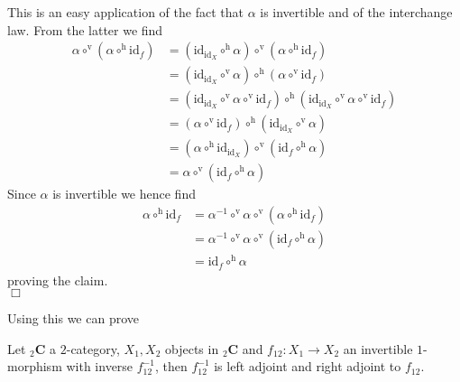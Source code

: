 \begin{prf}
This is an easy application of the fact that $\alpha$ is invertible and of the interchange law. From the latter we find
\begin{align*}
  \alpha
  \circ^{\mathrm{v}}
  \left(
    \alpha
    \circ^{\mathrm{h}}
    \mathrm{id}_{f}
  \right)
  &=
  \left(
    \mathrm{id}_{\mathrm{id}_{X}}
    \circ^{\mathrm{h}}
    \alpha
  \right)
  \circ^{\mathrm{v}}
  \left(
    \alpha
    \circ^{\mathrm{h}}
    \mathrm{id}_{f}
  \right)
  \\
  &=
  \left(
    \mathrm{id}_{\mathrm{id}_{X}}
    \circ^{\mathrm{v}}
    \alpha
  \right)
  \circ^{\mathrm{h}}
  \left(
    \alpha
    \circ^{\mathrm{v}}
    \mathrm{id}_{f}
  \right)
  \\
  &=
  \left(
    \mathrm{id}_{\mathrm{id}_{X}}
    \circ^{\mathrm{v}}
    \alpha
    \circ^{\mathrm{v}}
    \mathrm{id}_{f}
  \right)
  \circ^{\mathrm{h}}
  \left(
    \mathrm{id}_{\mathrm{id}_{X}}
    \circ^{\mathrm{v}}
    \alpha
    \circ^{\mathrm{v}}
    \mathrm{id}_{f}
  \right)
  \\
  &=
  \left(
    \alpha
    \circ^{\mathrm{v}}
    \mathrm{id}_{f}
  \right)
  \circ^{\mathrm{h}}
  \left(
    \mathrm{id}_{\mathrm{id}_{X}}
    \circ^{\mathrm{v}}
    \alpha
  \right)
  \\
  &=
  \left(
    \alpha
    \circ^{\mathrm{h}}
    \mathrm{id}_{\mathrm{id}_{X}}
  \right)
  \circ^{\mathrm{v}}
  \left(
    \mathrm{id}_{f}
    \circ^{\mathrm{h}}
    \alpha
  \right)
  \\
  &=
  \alpha
  \circ^{\mathrm{v}}
  \left(
    \mathrm{id}_{f}
    \circ^{\mathrm{h}}
    \alpha
  \right)
\end{align*}
Since $\alpha$ is invertible we hence find
\begin{align*}
  \alpha
  \circ^{\mathrm{h}}
  \mathrm{id}_{f}
  &=
  \alpha^{-1}
  \circ^{\mathrm{v}}
  \alpha
  \circ^{\mathrm{v}}
  \left(
    \alpha
    \circ^{\mathrm{h}}
    \mathrm{id}_{f}
  \right)
  \\
  &=
  \alpha^{-1}
  \circ^{\mathrm{v}}
  \alpha
  \circ^{\mathrm{v}}
  \left(
    \mathrm{id}_{f}
    \circ^{\mathrm{h}}
    \alpha
  \right)
  \\
  &=
  \mathrm{id}_{f}
  \circ^{\mathrm{h}}
  \alpha
\end{align*}
proving the claim.
\\
\phantom{proven}
\hfill
$\Box$
\end{prf}
Using this we can prove
\\
\begin{lem}
\label{lem:adjequiv}
Let ${_{2}}\mathbf{C}$ a $2$-category, $X_{1},X_{2}$ objects in ${_{2}}\mathbf{C}$ and $f_{12} \colon X_{1} \to X_{2}$ an invertible $1$-morphism with inverse $f_{12}^{-1}$, then $f_{12}^{-1}$ is left adjoint and right adjoint to $f_{12}$.
\end{lem}
